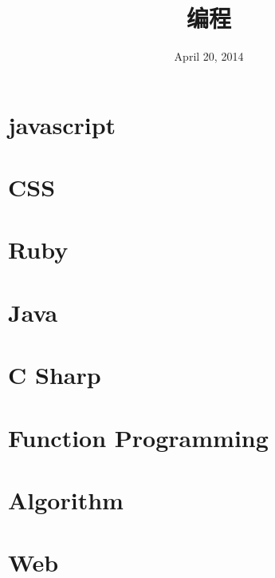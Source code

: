 \documentclass[12pt, oneside, b5paper]{book}
\title{编程}
\date{April 20, 2014}
\begin{document}
  
\maketitle

\part{javascript}













\part{CSS}


\part{Ruby}  


\part{Java}






\part{C Sharp}


\part{Function Programming}


\part{Algorithm}


\part{Web}

		
\newpage
\end{document}
